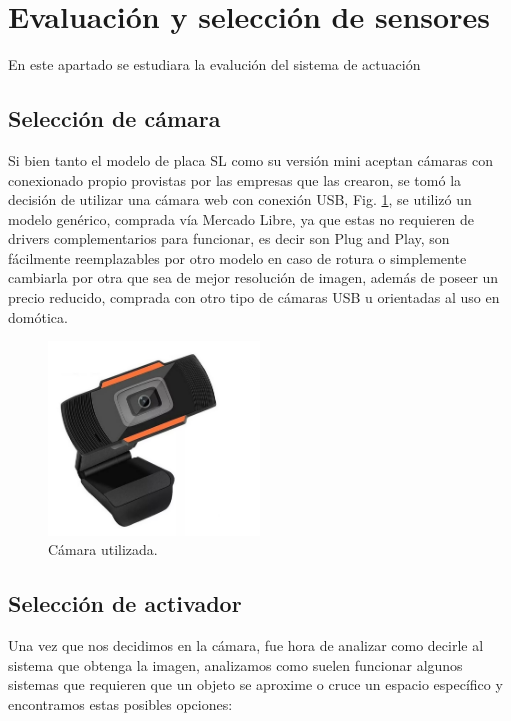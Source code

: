 \section{Evaluación y selección de sensores}

En este apartado se estudiara la evalución del sistema de actuación

\subsection{Selección de cámara}
Si bien tanto el modelo de placa SL como su versión mini aceptan cámaras con conexionado propio provistas por las empresas que las crearon,
se tomó la decisión de utilizar una cámara web con conexión USB, Fig. \ref{fig:camara-usb}, se utilizó un modelo genérico, comprada vía Mercado
Libre, ya que estas no requieren de drivers complementarios para funcionar, es decir son Plug and Play, son fácilmente reemplazables
por otro modelo en caso de rotura o simplemente cambiarla por otra que sea de mejor resolución de imagen, además de poseer un precio reducido,
comprada con otro tipo de cámaras USB u orientadas al uso en domótica.
\begin{figure}
    \centering
    \includegraphics[width=0.5\textwidth]{imgs/camara-usb.jpg}
    \caption{Cámara utilizada.}
    \label{fig:camara-usb}
\end{figure}

\subsection{Selección de activador}
Una vez que nos decidimos en la cámara, fue hora de analizar como decirle al sistema que obtenga la imagen, analizamos como suelen funcionar
algunos sistemas que requieren que un objeto se aproxime o cruce un espacio específico y encontramos estas posibles opciones:

